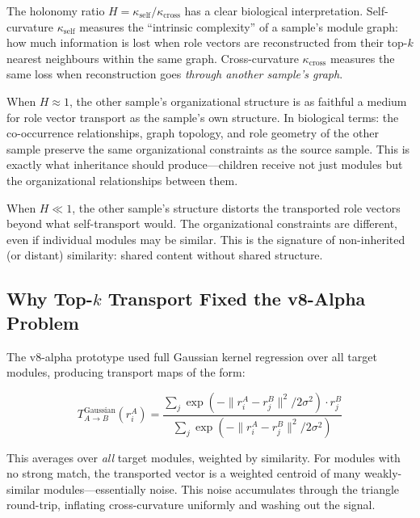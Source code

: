 \documentclass{../yalumba}
\begin{document}
The holonomy ratio $H = \kappa_{\text{self}} / \kappa_{\text{cross}}$
has a clear biological interpretation.  Self-curvature $\kappa_{\text{self}}$
measures the ``intrinsic complexity'' of a sample's module graph: how much
information is lost when role vectors are reconstructed from their top-$k$
nearest neighbours within the same graph.  Cross-curvature
$\kappa_{\text{cross}}$ measures the same loss when reconstruction goes
\emph{through another sample's graph}.


When $H \approx 1$, the other sample's organizational structure is as
faithful a medium for role vector transport as the sample's own structure.
In biological terms: the co-occurrence relationships, graph topology, and
role geometry of the other sample preserve the same organizational
constraints as the source sample.  This is exactly what inheritance should
produce---children receive not just modules but the organizational
relationships between them.

When $H \ll 1$, the other sample's structure distorts the transported role
vectors beyond what self-transport would.  The organizational constraints
are different, even if individual modules may be similar.  This is the
signature of non-inherited (or distant) similarity: shared content without
shared structure.

\subsection{Why Top-$k$ Transport Fixed the v8-Alpha Problem}

The v8-alpha prototype used full Gaussian kernel regression over all target
modules, producing transport maps of the form:

\begin{equation}
  T_{A \to B}^{\text{Gaussian}}(r_i^A) = \frac{\sum_j
    \exp(-\|r_i^A - r_j^B\|^2 / 2\sigma^2) \cdot r_j^B}
    {\sum_j \exp(-\|r_i^A - r_j^B\|^2 / 2\sigma^2)}
  \label{eq:gaussian-transport}
\end{equation}

This averages over \emph{all} target modules, weighted by similarity.  For
modules with no strong match, the transported vector is a weighted centroid
of many weakly-similar modules---essentially noise.  This noise accumulates
through the triangle round-trip, inflating cross-curvature uniformly and
washing out the signal.
\end{document}
